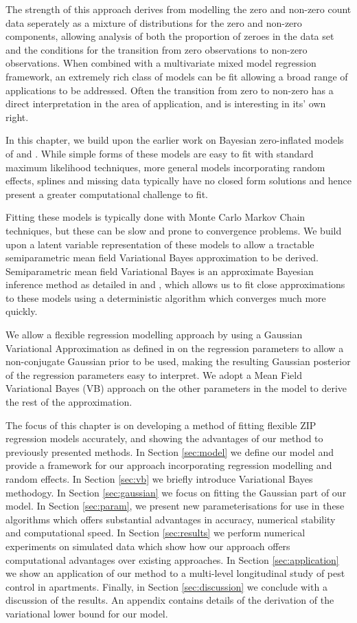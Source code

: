 \documentclass{amsart}[12pt]
\begin{document}
The strength of this approach derives from modelling the zero and non-zero count data seperately as a mixture
of distributions for the zero and non-zero components, allowing analysis of both the proportion of zeroes in
the data set and the conditions for the transition from zero observations to non-zero observations. When
combined with a multivariate mixed model regression framework, an extremely rich class of models can be fit
allowing a broad range of applications to be addressed. Often the transition from zero to non-zero has a
direct interpretation in the area of application, and is interesting in its' own right.

In this chapter, we build upon the earlier work on Bayesian zero-inflated models of \citep{Ghosh2006} and
\citep{Vatsa2014}. While simple forms of these models are easy to fit with standard maximum likelihood
techniques, more general models incorporating random effects, splines and missing data typically have no
closed form solutions and hence present a greater computational challenge to fit.

Fitting these models is typically done with Monte Carlo Markov Chain techniques, but these can be slow and
prone to convergence problems. We build upon a latent variable representation of these models to allow a 
tractable semiparametric mean field Variational Bayes approximation to be derived. Semiparametric mean field 
Variational Bayes is an approximate Bayesian inference method as detailed in \citep{Ormerod2010} and
\citep{Rohde2015}, which allows us to fit close approximations to these models using a deterministic 
algorithm which converges much more quickly.

We allow a flexible regression modelling approach by using a Gaussian Variational Approximation as defined in
\citep{Ormerod2012} on the regression parameters to allow a non-conjugate Gaussian prior to be used, making 
the resulting Gaussian posterior of the regression parameters easy to interpret. We adopt a Mean Field 
Variational Bayes (VB) approach on the other parameters in the model to derive the rest of the approximation.

The focus of this chapter is on developing a method of fitting flexible ZIP regression models accurately, and
showing the advantages of our method to previously presented methods. In Section \ref{sec:model} we define our
model and provide a framework for our approach incorporating regression modelling and random effects. In
Section \ref{sec:vb} we briefly introduce Variational Bayes methodogy. In Section \ref{sec:gaussian} we
focus on fitting the Gaussian part of our model. In Section \ref{sec:param}, we present new parameterisations for
use in these algorithms which offers substantial advantages in accuracy, numerical stability and computational
speed. In Section \ref{sec:results} we perform numerical experiments on simulated data which show how our
approach offers computational advantages over existing approaches. In Section \ref{sec:application} we show an
application of our method to a multi-level longitudinal study of pest control in apartments. Finally, in
Section \ref{sec:discussion} we conclude with a discussion of the results. An appendix contains details of the
derivation of the variational lower bound for our model.
\end{document}
